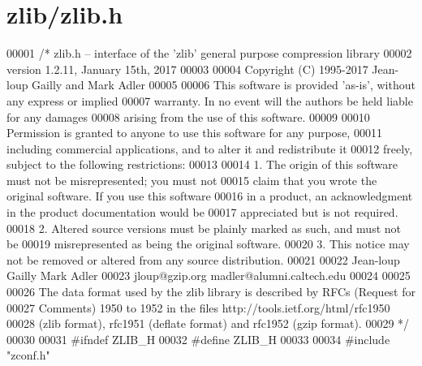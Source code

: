 \hypertarget{zlib_2zlib_8h_source}{}\section{zlib/zlib.h}
\label{zlib_2zlib_8h_source}

\begin{DoxyCode}
00001 \textcolor{comment}{/* zlib.h -- interface of the 'zlib' general purpose compression library}
00002 \textcolor{comment}{  version 1.2.11, January 15th, 2017}
00003 \textcolor{comment}{}
00004 \textcolor{comment}{  Copyright (C) 1995-2017 Jean-loup Gailly and Mark Adler}
00005 \textcolor{comment}{}
00006 \textcolor{comment}{  This software is provided 'as-is', without any express or implied}
00007 \textcolor{comment}{  warranty.  In no event will the authors be held liable for any damages}
00008 \textcolor{comment}{  arising from the use of this software.}
00009 \textcolor{comment}{}
00010 \textcolor{comment}{  Permission is granted to anyone to use this software for any purpose,}
00011 \textcolor{comment}{  including commercial applications, and to alter it and redistribute it}
00012 \textcolor{comment}{  freely, subject to the following restrictions:}
00013 \textcolor{comment}{}
00014 \textcolor{comment}{  1. The origin of this software must not be misrepresented; you must not}
00015 \textcolor{comment}{     claim that you wrote the original software. If you use this software}
00016 \textcolor{comment}{     in a product, an acknowledgment in the product documentation would be}
00017 \textcolor{comment}{     appreciated but is not required.}
00018 \textcolor{comment}{  2. Altered source versions must be plainly marked as such, and must not be}
00019 \textcolor{comment}{     misrepresented as being the original software.}
00020 \textcolor{comment}{  3. This notice may not be removed or altered from any source distribution.}
00021 \textcolor{comment}{}
00022 \textcolor{comment}{  Jean-loup Gailly        Mark Adler}
00023 \textcolor{comment}{  jloup@gzip.org          madler@alumni.caltech.edu}
00024 \textcolor{comment}{}
00025 \textcolor{comment}{}
00026 \textcolor{comment}{  The data format used by the zlib library is described by RFCs (Request for}
00027 \textcolor{comment}{  Comments) 1950 to 1952 in the files http://tools.ietf.org/html/rfc1950}
00028 \textcolor{comment}{  (zlib format), rfc1951 (deflate format) and rfc1952 (gzip format).}
00029 \textcolor{comment}{*/}
00030 
00031 \textcolor{preprocessor}{#ifndef ZLIB\_H}
00032 \textcolor{preprocessor}{#define ZLIB\_H}
00033 
00034 \textcolor{preprocessor}{#include "zconf.h"}

\end{DoxyCode}
